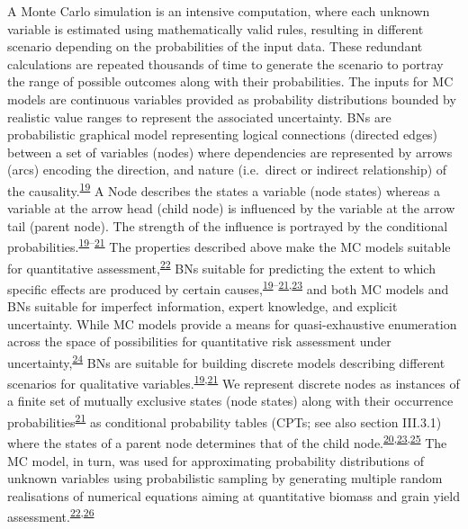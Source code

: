 \documentclass[12pt,oneside]{article}
\begin{document}
A Monte Carlo simulation is an intensive computation, where each unknown
variable is estimated using mathematically valid rules, resulting in
different scenario depending on the probabilities of the input data.
These redundant calculations are repeated thousands of time to generate
the scenario to portray the range of possible outcomes along with their
probabilities. The inputs for MC models are continuous variables
provided as probability distributions bounded by realistic value ranges
to represent the associated uncertainty. BNs are probabilistic graphical
model representing logical connections (directed edges) between a set of
variables (nodes) where dependencies are represented by arrows (arcs)
encoding the direction, and nature (i.e.~direct or indirect
relationship) of the
causality.\textsuperscript{\protect\hyperlink{ref-Pearl_1988}{19}} A
Node describes the states a variable (node states) whereas a variable at
the arrow head (child node) is influenced by the variable at the arrow
tail (parent node). The strength of the influence is portrayed by the
conditional
probabilities.\textsuperscript{\protect\hyperlink{ref-Pearl_1988}{19}--\protect\hyperlink{ref-Jensen_1996}{21}}
The properties described above make the MC models suitable for
quantitative
assessment,\textsuperscript{\protect\hyperlink{ref-Hubbard_2014}{22}}
BNs suitable for predicting the extent to which specific effects are
produced by certain
causes,\textsuperscript{\protect\hyperlink{ref-Pearl_1988}{19}--\protect\hyperlink{ref-Jensen_1996}{21},\protect\hyperlink{ref-Scutari_and_Denis_2015}{23}}
and both MC models and BNs suitable for imperfect information, expert
knowledge, and explicit uncertainty. While MC models provide a means for
quasi-exhaustive enumeration across the space of possibilities for
quantitative risk assessment under
uncertainty,\textsuperscript{\protect\hyperlink{ref-Rosenstock_et_al_2014}{24}}
BNs are suitable for building discrete models describing different
scenarios for qualitative
variables.\textsuperscript{\protect\hyperlink{ref-Pearl_1988}{19},\protect\hyperlink{ref-Jensen_1996}{21}}
We represent discrete nodes as instances of a finite set of mutually
exclusive states (node states) along with their occurrence
probabilities\textsuperscript{\protect\hyperlink{ref-Jensen_1996}{21}}
as conditional probability tables (CPTs; see also section III.3.1) where
the states of a parent node determines that of the child
node.\textsuperscript{\protect\hyperlink{ref-Fenton_and_Neil_2013}{20},\protect\hyperlink{ref-Scutari_and_Denis_2015}{23},\protect\hyperlink{ref-Jensen_and_Nielsen_2007}{25}}
The MC model, in turn, was used for approximating probability
distributions of unknown variables using probabilistic sampling by
generating multiple random realisations of numerical equations aiming at
quantitative biomass and grain yield
assessment.\textsuperscript{\protect\hyperlink{ref-Hubbard_2014}{22},\protect\hyperlink{ref-Luedeling_et_al_2015}{26}}
\end{document}
